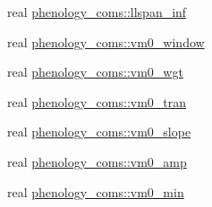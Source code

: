 \begin{DoxyCompactItemize}
\item 
real \hyperlink{namespacephenology__coms_ae7c68f51eddeab6a2c016f296c4aeaba}{phenology\+\_\+coms\+::llspan\+\_\+inf}
\item 
real \hyperlink{namespacephenology__coms_a3b059a9f40578445e857c7fcfc27b249}{phenology\+\_\+coms\+::vm0\+\_\+window}
\item 
real \hyperlink{namespacephenology__coms_ac445b422671842a19092485ee7b6ea62}{phenology\+\_\+coms\+::vm0\+\_\+wgt}
\item 
real \hyperlink{namespacephenology__coms_af787e4d677bce2e896156b099a081662}{phenology\+\_\+coms\+::vm0\+\_\+tran}
\item 
real \hyperlink{namespacephenology__coms_a6eb68bfc2f600cc011376c42a6d005a8}{phenology\+\_\+coms\+::vm0\+\_\+slope}
\item 
real \hyperlink{namespacephenology__coms_a6f4263a7594e8eec3ea9d87a813fcab4}{phenology\+\_\+coms\+::vm0\+\_\+amp}
\item 
real \hyperlink{namespacephenology__coms_aa38ce138ee3ecc2631538336aad47054}{phenology\+\_\+coms\+::vm0\+\_\+min}
\end{DoxyCompactItemize}
